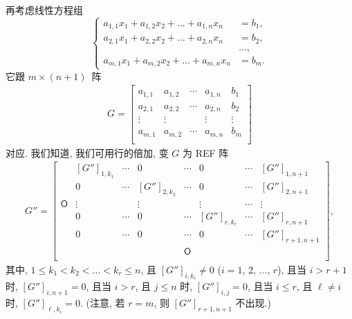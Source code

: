 \documentclass[../libro.tex]{subfiles}
\begin{document}
再考虑线性方程组
\begin{equation}
    \left\{ %
    \begin{aligned}
        a_{1,1} x_1 + a_{1,2} x_2 + \dots + a_{1,n} x_n & = b_1, \\
        a_{2,1} x_1 + a_{2,2} x_2 + \dots + a_{2,n} x_n & = b_2, \\
        & \dots, \\
        a_{m,1} x_1 + a_{m,2} x_2 + \dots + a_{m,n} x_n & = b_m.
    \end{aligned}
    \right. %
    \label{eq:sole-8}
\end{equation}
它跟 \(m \times (n + 1)\)~阵
\begin{align*}
    G =
    \begin{bmatrix}
        a_{1,1} & a_{1,2} & \cdots & a_{1,n} & b_1    \\
        a_{2,1} & a_{2,2} & \cdots & a_{2,n} & b_2    \\
        \vdots  & \vdots  & {}     & \vdots  & \vdots \\
        a_{m,1} & a_{m,2} & \cdots & a_{m,n} & b_m    \\
    \end{bmatrix}
\end{align*}
对应.
我们知道, 我们可用行的倍加,
变 \(G\) 为 REF 阵
\begin{align*}
    G'' =
    \begin{bmatrix}
        {}         & [G'']_{1,k_1} & \cdots & 0             & \cdots     & 0             & \cdots & [G'']_{1,n+1}   \\
        {}         & 0             & \cdots & [G'']_{2,k_2} & \cdots     & 0             & \cdots & [G'']_{2,n+1}   \\
        \mathsf{O} & \vdots        & {}     & \vdots        & {}         & \vdots        & \cdots & \vdots          \\
        {}         & 0             & \cdots & 0             & \cdots     & [G'']_{r,k_r} & \cdots & [G'']_{r,n+1}   \\
        {}         & 0             & \cdots & 0             & \cdots     & 0             & \cdots & [G'']_{r+1,n+1} \\
        {}         & {}            & {}     & {}            & \mathsf{O} & {}            & {}     & {}              \\
    \end{bmatrix},
\end{align*}
其中,
\(1 \leq k_1 < k_2 < \dots < k_r \leq n\),
且 \([G'']_{i,k_i} \neq 0\)
(\(i = 1\), \(2\), \(\dots\), \(r\)),
且当 \(i > r + 1\) 时, \([G'']_{i,n+1} = 0\),
且当 \(i > r\), 且 \(j \leq n\) 时,
\([G'']_{i,j} = 0\),
且当 \(i \leq r\), 且 \(\ell \neq i\) 时,
\([G'']_{\ell,k_i} = 0\).
(注意, 若 \(r = m\), 则 \([G'']_{r+1,n+1}\) 不出现.)
\end{document}
